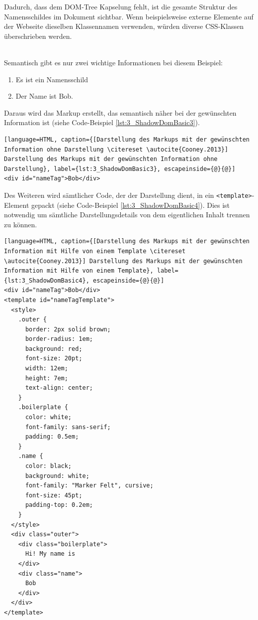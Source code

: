 Dadurch, dass dem DOM-Tree Kapselung fehlt, ist die gesamte Struktur des Namensschildes im Dokument sichtbar. Wenn beispielsweise externe Elemente auf der Webseite dieselben Klassennamen verwenden, würden diverse CSS-Klassen überschrieben werden.

\begin{enumerate}
 \hfill \\
Semantisch gibt es nur zwei wichtige Informationen bei diesem Beispiel:
\begin{enumerate}
\item Es ist ein Namensschild
\item Der Name ist \glqq Bob\grqq .
\end{enumerate}
Daraus wird das Markup erstellt, das semantisch näher bei der gewünschten Information ist (siehe Code-Beispiel \ref{lst:3_ShadowDomBasic3}).

\begin{lstlisting}[language=HTML, caption={[Darstellung des Markups mit der gewünschten Information ohne Darstellung \citereset \autocite{Cooney.2013}] Darstellung des Markups mit der gewünschten Information ohne Darstellung}, label={lst:3_ShadowDomBasic3}, escapeinside={@}{@}]
<div id="nameTag">Bob</div>
\end{lstlisting}

Des Weiteren wird sämtlicher Code, der der Darstellung dient, in ein \lstinline|<template>|-Element gepackt (siehe Code-Beispiel \ref{lst:3_ShadowDomBasic4}). Dies ist notwendig um sämtliche Darstellungsdetails von dem eigentlichen Inhalt trennen zu können.

\begin{lstlisting}[language=HTML, caption={[Darstellung des Markups mit der gewünschten Information mit Hilfe von einem Template \citereset \autocite{Cooney.2013}] Darstellung des Markups mit der gewünschten Information mit Hilfe von einem Template}, label={lst:3_ShadowDomBasic4}, escapeinside={@}{@}]
<div id="nameTag">Bob</div>
<template id="nameTagTemplate">
  <style>
    .outer {
      border: 2px solid brown;
      border-radius: 1em;
      background: red;
      font-size: 20pt;
      width: 12em;
      height: 7em;
      text-align: center;
    }
    .boilerplate {
      color: white;
      font-family: sans-serif;
      padding: 0.5em;
    }
    .name {
      color: black;
      background: white;
      font-family: "Marker Felt", cursive;
      font-size: 45pt;
      padding-top: 0.2em;
    }
  </style>
  <div class="outer">
    <div class="boilerplate">
      Hi! My name is
    </div>
    <div class="name">
      Bob
    </div>
  </div>
</template>
\end{lstlisting}


\end{enumerate}
